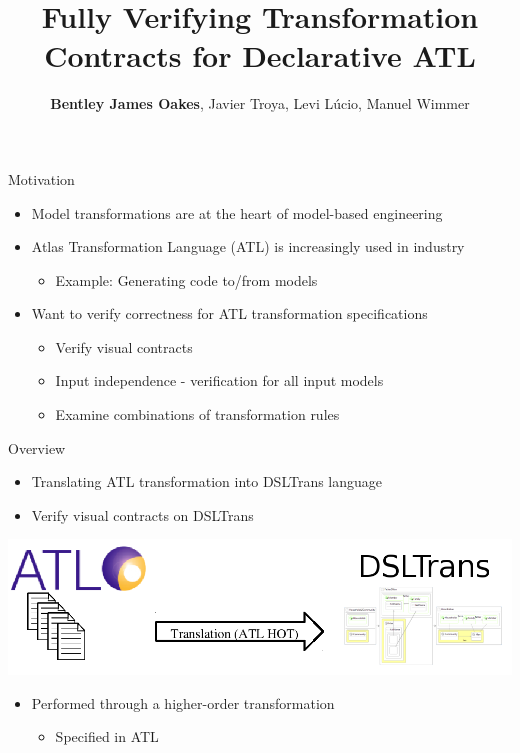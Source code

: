 \documentclass[xcolor=dvipsnames, 12pt]{beamer}
\title[Verifying ATL]{Fully Verifying Transformation Contracts for Declarative ATL}
\author[Oakes, Troya, Lucio, Wimmer]{\textbf{Bentley James Oakes}, Javier Troya, Levi L\'{u}cio, Manuel Wimmer}
\institute[]{McGill University, Canada\\Vienna University of Technology, Austria}
\begin{document}
\maketitle


\begin{frame}{Motivation}
\begin{itemize}[<+->]
\item Model transformations are at the heart of model-based engineering
\item Atlas Transformation Language (ATL) is increasingly used in industry
\begin{itemize}
\item Example: Generating code to/from models
\end{itemize}

\item Want to verify correctness for ATL transformation specifications
\begin{itemize}[<+->]
\item Verify visual contracts
\item Input independence - verification for all input models
\item Examine combinations of transformation rules
\end{itemize}
\end{itemize}
\end{frame}

\begin{frame}{Overview}

\begin{itemize}[<+->]
\item Translating ATL transformation into DSLTrans language
\item Verify visual contracts on DSLTrans
\end{itemize}
\begin{center}
\includegraphics[width=\textwidth]{figures/overview}
\end{center}
\begin{itemize}[<+->]
\item Performed through a higher-order transformation
\begin{itemize}
\item Specified in ATL
\end{itemize}
\end{itemize}
\end{frame}
\end{document}
